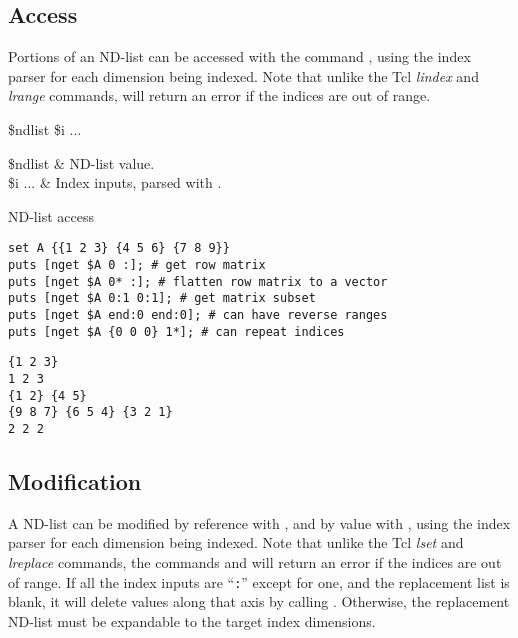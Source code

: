 \subsection{Access}
Portions of an ND-list can be accessed with the command , using the index parser  for each dimension being indexed.
Note that unlike the Tcl \textit{lindex} and \textit{lrange} commands,  will return an error if the indices are out of range.
\begin{syntax}
 \$ndlist \$i ...
\end{syntax}
\begin{args}
\$ndlist & ND-list value. \\
\$i ... & Index inputs, parsed with . 
\end{args}
\begin{example}{ND-list access}
\begin{lstlisting}
set A {{1 2 3} {4 5 6} {7 8 9}}
puts [nget $A 0 :]; # get row matrix
puts [nget $A 0* :]; # flatten row matrix to a vector
puts [nget $A 0:1 0:1]; # get matrix subset
puts [nget $A end:0 end:0]; # can have reverse ranges
puts [nget $A {0 0 0} 1*]; # can repeat indices
\end{lstlisting}
\tcblower
\begin{lstlisting}
{1 2 3}
1 2 3
{1 2} {4 5}
{9 8 7} {6 5 4} {3 2 1}
2 2 2
\end{lstlisting}
\end{example}

\clearpage
\subsection{Modification}
A ND-list can be modified by reference with , and by value with , using the index parser  for each dimension being indexed.
Note that unlike the Tcl \textit{lset} and \textit{lreplace} commands, the commands  and  will return an error if the indices are out of range.
If all the index inputs are ``\texttt{:}'' except for one, and the replacement list is blank, it will delete values along that axis by calling .
Otherwise, the replacement ND-list must be expandable to the target index dimensions. 

